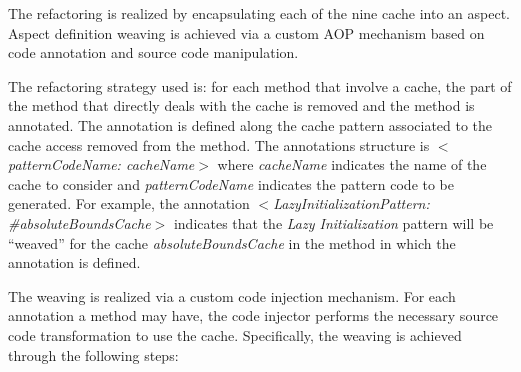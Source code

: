 \documentclass[preprint,10pt]{sigplanconf}
\begin{document}
The refactoring is realized by encapsulating each of the nine cache into an aspect. Aspect definition weaving is achieved via a custom AOP mechanism based on code annotation and source code manipulation. 


The refactoring strategy used is: for each method that involve a cache, the part of the method that directly deals with the cache is removed and the method is annotated.
The annotation is defined along the cache pattern associated to the cache access removed from the method.
The annotations structure is \emph{$<$patternCodeName: cacheName$>$} where \emph{cacheName} indicates the name of the cache to consider and \emph{patternCodeName} indicates the pattern code to be generated. For example, the annotation \emph{$<$LazyInitializationPattern: \#absoluteBoundsCache$>$} indicates that the \emph{Lazy Initialization} pattern will be ``weaved'' for the cache \emph{absoluteBoundsCache} in the method in which the annotation is defined.

The weaving is realized via a custom code injection mechanism. For each annotation a method may have, the code injector performs the necessary source code transformation to use the cache. Specifically, the weaving is achieved through the following steps:
\end{document}
